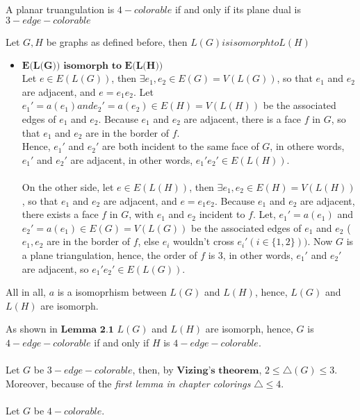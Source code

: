 \documentclass[a4paper]{article}
\begin{document}
\begin{solution}{30}
\begin{theorem}{A planar truangulation is $4-colorable$ if and only if its plane dual is $3-edge-colorable$}
\begin{mylemma} {Let $G,H$ be graphs as defined before, then $L(G) is isomorph to L(H)$}
\begin{itemize}
						\item $\textbf{E(L(G)) isomorph to E(L(H))}$\\
							Let $e \in E(L(G))$, then $\exists e_1,e_2 \in E(G)=V(L(G))$, so that $e_1$ and $e_2$ are adjacent, and $e=e_1e_2$. Let $e_1' = a(e_1) and e_2'=a(e_2) \in E(H)=V(L(H))$ be the associated edges of $e_1$ and $e_2$.
							Because $e_1$ and $e_2$ are adjacent, there is a face $f$ in $G$, so that $e_1$ and $e_2$ are in the border of $f$.\\
							Hence, $e_1'$ and $e_2'$ are both incident to the same face of $G$, in othere words, $e_1'$ and $e_2'$ are adjacent, in other words, $e_1'e_2' \in E(L(H))$.\\\\
							
							On the other side, let $e \in E(L(H))$, then $\exists e_1,e_2 \in E(H)=V(L(H))$, so that $e_1$ and $e_2$ are adjacent, and $e=e_1e_2$.
							Because $e_1$ and $e_2$ are adjacent, there exists a face $f$ in $G$, with $e_1$ and $e_2$ incident to $f$. Let, $e_1'=a(e_1)$ and $e_2'=a(e_1) \in E(G)=V(L(G))$ be the associated edges of $e_1$ and $e_2$ ($e_1,e_2$ are in the border of $f$, else $e_i$ wouldn't cross $e_i' (i \in  \{1,2\}))$. Now $G$ is a plane triangulation, hence, the order of $f$ is 3, in other words, $e_1'$ and $e_2'$ are adjacent, so $e_1'e_2' \in E(L(G))$.
					\end{itemize}			
					
					All in all, $a$ is a isomoprhism between $L(G)$ and $L(H)$, hence, $L(G)$ and $L(H)$ are isomorph.
				\end{mylemma}
				
				
				As shown in $\textbf{Lemma 2.1}$ $L(G)$ and $L(H)$ are isomorph, hence, $G$ is $4-edge-colorable$ if and only if $H$ is $4-edge-colorable$.\\\\
				
				Let $G$ be $3-edge-colorable$, then, by $\textbf{Vizing's theorem}$, $2 \le \triangle(G) \le 3$. Moreover, because of the \emph{first lemma in chapter colorings} $\triangle \le 4$.\\\\
				
				Let $G$ be $4-colorable$.
			\end{theorem}
		\end{solution}
		\newpage
\end{document}
